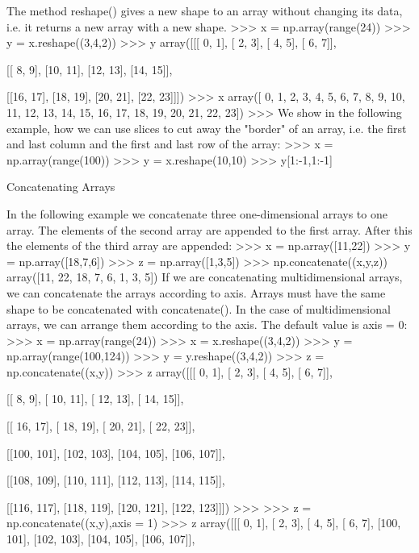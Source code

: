 The method reshape() gives a new shape to an array without changing its data, i.e. it returns a new array with a new shape.
>>> x = np.array(range(24))
>>> y = x.reshape((3,4,2))
>>> y
array([[[ 0,  1],
        [ 2,  3],
        [ 4,  5],
        [ 6,  7]],

       [[ 8,  9],
        [10, 11],
        [12, 13],
        [14, 15]],

       [[16, 17],
        [18, 19],
        [20, 21],
        [22, 23]]])
>>> x
array([ 0,  1,  2,  3,  4,  5,  6,  7,  8,  9, 10, 11, 12, 13, 14, 15, 16,
       17, 18, 19, 20, 21, 22, 23])
>>> 
We show in the following example, how we can use slices to cut away the "border" of an array, i.e. the first and last column and the first and last row of the array:
>>> x = np.array(range(100))
>>> y = x.reshape(10,10)
>>> y[1:-1,1:-1]


Concatenating Arrays

In the following example we concatenate three one-dimensional arrays to one array. The elements of the second array are appended to the first array. After this the elements of the third array are appended:
>>> x = np.array([11,22])
>>> y = np.array([18,7,6])
>>> z = np.array([1,3,5])
>>> np.concatenate((x,y,z))
array([11, 22, 18,  7,  6,  1,  3,  5])
If we are concatenating multidimensional arrays, we can concatenate the arrays according to axis. Arrays must have the same shape to be concatenated with concatenate(). In the case of multidimensional arrays, we can arrange them according to the axis. The default value is axis = 0:
>>> x = np.array(range(24))
>>> x = x.reshape((3,4,2))
>>> y = np.array(range(100,124))
>>> y = y.reshape((3,4,2))
>>> z = np.concatenate((x,y))
>>> z
array([[[  0,   1],
        [  2,   3],
        [  4,   5],
        [  6,   7]],

       [[  8,   9],
        [ 10,  11],
        [ 12,  13],
        [ 14,  15]],

       [[ 16,  17],
        [ 18,  19],
        [ 20,  21],
        [ 22,  23]],

       [[100, 101],
        [102, 103],
        [104, 105],
        [106, 107]],

       [[108, 109],
        [110, 111],
        [112, 113],
        [114, 115]],

       [[116, 117],
        [118, 119],
        [120, 121],
        [122, 123]]])
>>> 
>>> z = np.concatenate((x,y),axis = 1)
>>> z
array([[[  0,   1],
        [  2,   3],
        [  4,   5],
        [  6,   7],
        [100, 101],
        [102, 103],
        [104, 105],
        [106, 107]],

